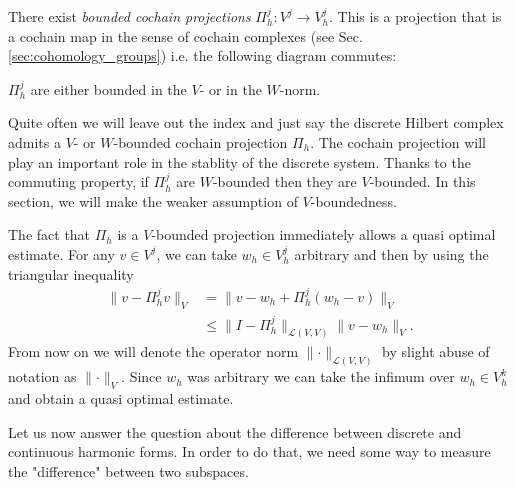 \documentclass[../master_thesis.tex]{subfiles}
\begin{document}
\begin{assumption}
    There exist  \textit{bounded cochain projections} $\Pi^j_h : V^j \rightarrow V^j_h$. 
    This is a projection that is a cochain map in the sense of cochain complexes 
    (see Sec.\,\ref{sec:cohomology_groups}) i.e. 
    the following diagram commutes: 
    \begin{center}
    \end{center}
    $\Pi^j_h$ are either bounded in the $V$- or in the $W$-norm. 
\end{assumption}
Quite often we will leave out the index and just say the discrete Hilbert complex admits a 
$V$- or $W$-bounded cochain projection $\Pi_h$.
The cochain projection will play an important 
role in the stablity of the discrete system. 
Thanks to the commuting property, if $\Pi^j_h$ are $W$-bounded then they are $V$-bounded. 
In this section, we will make 
the weaker assumption of $V$-boundedness.

The fact that $\Pi_h$ is a $V$-bounded projection immediately allows a quasi 
optimal estimate. For any $v \in V^j$,  we can take 
$w_h \in V^j_h$ arbitrary and then by using the triangular inequality
\begin{align}
    \lVert v - \Pi^j_h v \rVert _V
    &=  \lVert v - w_h  + \Pi^j_h  (w_h - v) \rVert _V
    \\ &\leq \lVert I - \Pi^j_h\rVert _{\mathcal{L}(V,V)} \lVert v - w_h \rVert _V. 
    \label{eq:bound_projection}
\end{align}
From now on we will denote the operator norm $\lVert \cdot \rVert _{\mathcal{L}(V,V)}$ 
by slight abuse of notation as $\lVert \cdot \rVert _V$.
Since $w_h$ was arbitrary we can take the infimum over $w_h \in V_h^k$ and obtain 
a quasi optimal estimate. 

Let us now answer the question about the difference between discrete and continuous 
harmonic forms. In order to do that, we need some way to measure the "difference" 
between two subspaces. 
\end{document}
